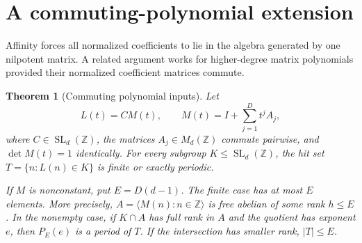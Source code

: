 \documentclass[11pt,letterpaper]{article}
\newtheorem{theorem}{Theorem}[section]
\theoremstyle{definition}
\theoremstyle{remark}
\newcommand{\Z}{\mathbb Z}
\newcommand{\SL}{\operatorname{SL}}
\begin{document}
\section{A commuting-polynomial extension}\label{gts:ai:sec:commuting}
Affinity forces all normalized coefficients to lie in the algebra generated by one nilpotent matrix. A related argument works for higher-degree matrix polynomials provided their normalized coefficient matrices commute.

\begin{theorem}[Commuting polynomial inputs]\label{gts:ai:thm:commuting}
Let
\[
 L(t)=C M(t),\qquad
 M(t)=I+\sum_{j=1}^{D}t^jA_j,
\]
where $C\in\SL_d(\Z)$, the matrices $A_j\in M_d(\Z)$ commute pairwise, and $\det M(t)=1$ identically. For every subgroup $K\le\SL_d(\Z)$, the hit set $T=\{n:L(n)\in K\}$ is finite or exactly periodic.

If $M$ is nonconstant, put $E=D(d-1)$. The finite case has at most $E$ elements. More precisely, $A=\langle M(n):n\in\Z\rangle$ is free abelian of some rank $h\le E$. In the nonempty case, if $K\cap A$ has full rank in $A$ and the quotient has exponent $e$, then $P_E(e)$ is a period of $T$. If the intersection has smaller rank, $|T|\le E$.
\end{theorem}
\end{document}
